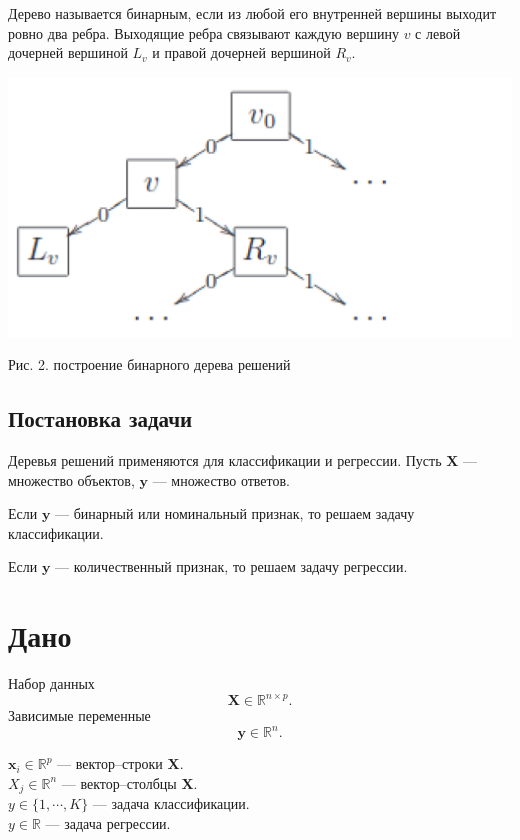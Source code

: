 \documentclass{article}
\begin{document}
Дерево называется бинарным, если из любой его внутренней вершины выходит ровно два ребра. Выходящие ребра связывают каждую вершину $v$ с левой дочерней вершиной $L_v$ и правой дочерней вершиной $R_v$.
\begin{center}
	\includegraphics[scale=0.2]{pic2}
\end{center}
\begin{center}
	Рис. 2. построение бинарного дерева решений
\end{center}
\subsection{Постановка задачи}

Деревья решений применяются для классификации и регрессии. Пусть $\textbf{X}$ --- множество объектов, $\textbf{y}$ --- множество ответов. 

Если $\textbf{y}$ --- бинарный или номинальный признак, то решаем задачу классификации.

Если $\textbf{y}$ --- количественный признак, то решаем задачу регрессии.

\newpage

\section{Дано}

\noindent Набор данных
$$\textbf{X} \in \mathbb{R}^{n \times p}.$$
Зависимые переменные
$$\textbf{y} \in \mathbb{R}^n.$$

\noindent $\textbf{x}_i \in \mathbb{R}^p$ --- вектор--строки $\textbf{X}$.\\
$X_j \in \mathbb{R}^n$ --- вектор--столбцы $\textbf{X}.$\\

\noindent$y \in \{1, \cdots, K \}$ --- задача классификации.\\
$y \in \mathbb{R}$ --- задача регрессии.\\
\end{document}
